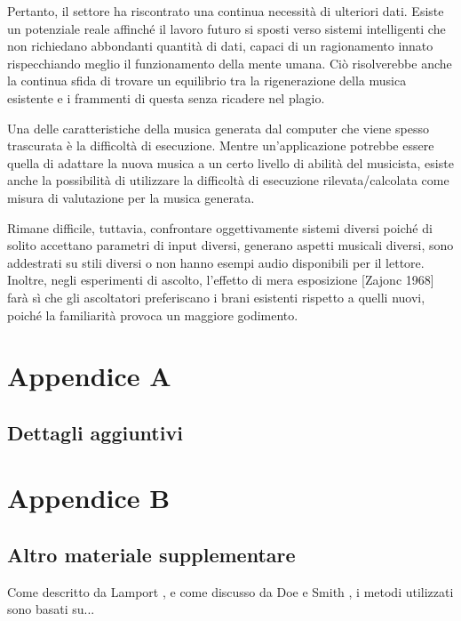 \documentclass[a4paper,12pt]{report}
\begin{document}
Pertanto, il settore ha riscontrato una continua necessità di ulteriori dati. 
Esiste un potenziale reale affinché il lavoro futuro si sposti verso sistemi intelligenti che non richiedano abbondanti quantità di dati, capaci di un ragionamento innato rispecchiando meglio il funzionamento della mente umana. 
Ciò risolverebbe anche la continua sfida di trovare un equilibrio tra la rigenerazione della musica esistente e i frammenti di questa senza ricadere nel plagio.

Una delle caratteristiche della musica generata dal computer che viene spesso trascurata è la difficoltà di esecuzione. 
Mentre un'applicazione potrebbe essere quella di adattare la nuova musica a un certo livello di abilità del musicista, esiste anche la possibilità di utilizzare la difficoltà di esecuzione rilevata/calcolata come misura di valutazione per la musica generata.

Rimane difficile, tuttavia, confrontare oggettivamente sistemi diversi poiché di solito accettano parametri di input diversi, generano aspetti musicali diversi, sono addestrati su stili diversi o non hanno esempi audio disponibili per il lettore. Inoltre, negli esperimenti di ascolto, l’effetto di mera esposizione [Zajonc 1968] farà sì che gli ascoltatori preferiscano i brani esistenti rispetto a quelli nuovi, poiché la familiarità provoca un maggiore godimento.

\appendix
\chapter{Appendice A}
\section{Dettagli aggiuntivi}

\chapter{Appendice B}
\section{Altro materiale supplementare}

Come descritto da Lamport \cite{latex}, e come discusso da Doe e Smith \cite{example_article}, i metodi utilizzati sono basati su...



\end{document}
